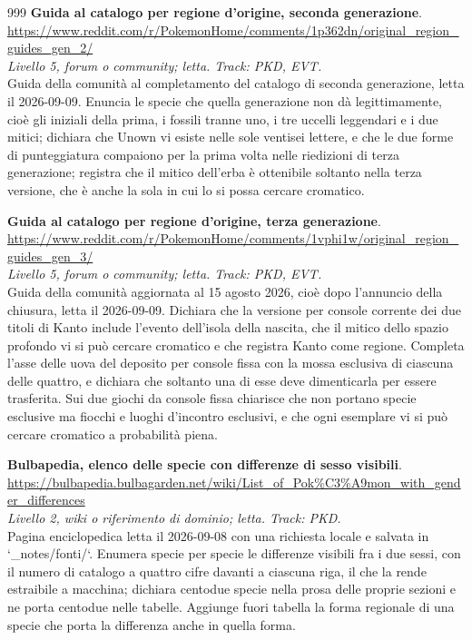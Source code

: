 \begin{thebibliography}{999}
  \textbf{Guida al catalogo per regione d'origine, seconda generazione}.
  \\ \url{https://www.reddit.com/r/PokemonHome/comments/1p362dn/original_region_guides_gen_2/}
  \\ \emph{Livello 5, forum o community; letta. Track: PKD, EVT.}
  \\ Guida della comunità al completamento del catalogo di seconda generazione, letta il 2026-09-09. Enuncia le specie che quella generazione non dà legittimamente, cioè gli iniziali della prima, i fossili tranne uno, i tre uccelli leggendari e i due mitici; dichiara che Unown vi esiste nelle sole ventisei lettere, e che le due forme di punteggiatura compaiono per la prima volta nelle riedizioni di terza generazione; registra che il mitico dell'erba è ottenibile soltanto nella terza versione, che è anche la sola in cui lo si possa cercare cromatico.

  \textbf{Guida al catalogo per regione d'origine, terza generazione}.
  \\ \url{https://www.reddit.com/r/PokemonHome/comments/1vphi1w/original_region_guides_gen_3/}
  \\ \emph{Livello 5, forum o community; letta. Track: PKD, EVT.}
  \\ Guida della comunità aggiornata al 15 agosto 2026, cioè dopo l'annuncio della chiusura, letta il 2026-09-09. Dichiara che la versione per console corrente dei due titoli di Kanto include l'evento dell'isola della nascita, che il mitico dello spazio profondo vi si può cercare cromatico e che registra Kanto come regione. Completa l'asse delle uova del deposito per console fissa con la mossa esclusiva di ciascuna delle quattro, e dichiara che soltanto una di esse deve dimenticarla per essere trasferita. Sui due giochi da console fissa chiarisce che non portano specie esclusive ma fiocchi e luoghi d'incontro esclusivi, e che ogni esemplare vi si può cercare cromatico a probabilità piena.

  \textbf{Bulbapedia, elenco delle specie con differenze di sesso visibili}.
  \\ \url{https://bulbapedia.bulbagarden.net/wiki/List_of_Pok\%C3\%A9mon_with_gender_differences}
  \\ \emph{Livello 2, wiki o riferimento di dominio; letta. Track: PKD.}
  \\ Pagina enciclopedica letta il 2026-09-08 con una richiesta locale e salvata in `\_notes/fonti/`. Enumera specie per specie le differenze visibili fra i due sessi, con il numero di catalogo a quattro cifre davanti a ciascuna riga, il che la rende estraibile a macchina; dichiara centodue specie nella prosa delle proprie sezioni e ne porta centodue nelle tabelle. Aggiunge fuori tabella la forma regionale di una specie che porta la differenza anche in quella forma.


\end{thebibliography}
